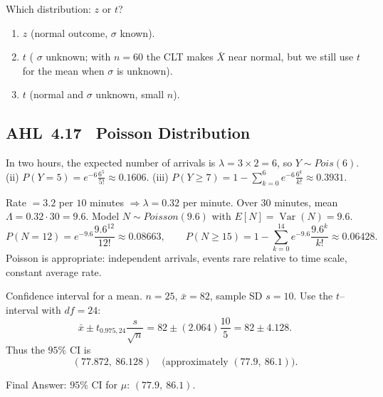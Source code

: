 \documentclass[11pt]{article}
\def\textbf#1{#1}%
\def\mathrm#1{#1}%
\newcommand{\tocsubsection}[1]{\subsection{#1}}
\begin{document}
\begin{solution}
\textbf{Which distribution: $z$ or $t$?}

\begin{enumerate}
  \item $z$ (normal outcome, $\sigma$ known).
  \item $t$ ( $\sigma$ unknown; with $n=60$ the CLT makes $\bar X$ near normal, but we still use $t$ for the mean when $\sigma$ is unknown).
  \item $t$ (normal and $\sigma$ unknown, small $n$).
\end{enumerate}
\end{solution}



\tocsubsection{AHL 4.17 \; Poisson Distribution}

\begin{solution}
In two hours, the expected number of arrivals is $\lambda=3\times2=6$, so
$Y\sim\mathrm{Pois}(6)$.  (ii) $P(Y=5)=e^{-6}\tfrac{6^5}{5!}\approx0.1606$.
(iii) $P(Y\ge7)=1-\sum_{k=0}^6 e^{-6}\tfrac{6^k}{k!}\approx0.3931$.
\end{solution}

\begin{solution}
Rate $=3.2$ per $10$ minutes $\Rightarrow \lambda=0.32$ per minute. Over $30$ minutes, mean $\Lambda=0.32\cdot 30=9.6$. Model $N\sim\mathrm{Poisson}(9.6)$ with $E[N]=\operatorname{Var}(N)=9.6$.
\[
P(N=12)=e^{-9.6}\frac{9.6^{12}}{12!}\approx 0.08663,\qquad
P(N\ge 15)=1-\sum_{k=0}^{14}e^{-9.6}\frac{9.6^k}{k!}\approx 0.06428.
\]
Poisson is appropriate: independent arrivals, events rare relative to time scale, constant average rate.
\end{solution}


\begin{solution}
\textbf{Confidence interval for a mean.}  $n=25$, $\bar x=82$, sample SD $s=10$.  
Use the $t$–interval with $df=24$:
\[
\bar x \pm t_{0.975,24}\frac{s}{\sqrt{n}}
=82 \pm (2.064)\frac{10}{5}
=82 \pm 4.128.
\]
Thus the $95\%$ CI is
\[
\boxed{(77.872,\ 86.128)} \quad \text{(approximately }(77.9,\ 86.1)\text{)}.
\]

\textbf{Final Answer:} $95\%$ CI for $\mu$: $(77.9,\ 86.1)$.
\end{solution}
\end{document}
